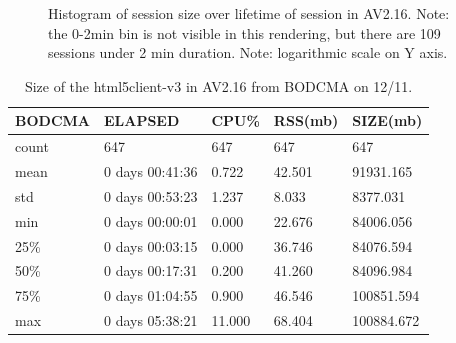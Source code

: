 \documentclass{article}
\begin{document}
\begin{figure}[H]
        \caption{\label{FIGURE-AV216SessionLength} Histogram of session size over lifetime of session in AV2.16. Note: the 0-2min bin is not visible in this rendering, but there are 109 sessions under 2 min duration. Note: logarithmic scale on Y axis.}
\end{figure}



\begin{table}[H]
\begin{tabular}{|l|l|l|l|l|}
\hline BODCMA&                     ELAPSED&        CPU\%&     RSS(mb)&       SIZE(mb) \\
\hline count&                     647&  647&  647&     647 \\
\hline mean&   0 days 00:41:36&    0.722&   42.501&   91931.165 \\
\hline std&    0 days 00:53:23&    1.237&    8.033&    8377.031 \\
\hline min&           0 days 00:00:01&    0.000&   22.676&   84006.056 \\
\hline 25\%&           0 days 00:03:15&    0.000&   36.746&   84076.594 \\
\hline 50\%&           0 days 00:17:31&    0.200&   41.260&   84096.984 \\
\hline 75\%&           0 days 01:04:55&    0.900&   46.546&  100851.594 \\
\hline max&           0 days 05:38:21&   11.000&   68.404&  100884.672 \\
\hline 
\end{tabular}
\caption{\label{TABLE-AV216html5}Size of the html5client-v3 in AV2.16 from BODCMA on 12/11.} 
\end{table}
\end{document}
